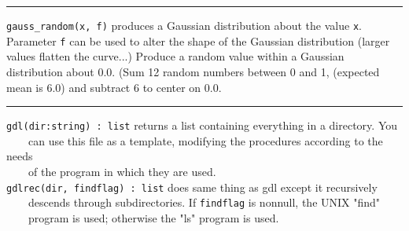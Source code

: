 
\vspace{0.25cm}\hrule{}

\texttt{gauss\_random(x, f)} produces a Gaussian distribution about the value \texttt{x}.
Parameter \texttt{f} can be used to alter the shape of the Gaussian
distribution (larger values flatten the curve...) Produce a random
value within a Gaussian distribution about 0.0. (Sum 12 random numbers
between 0 and 1, (expected mean is 6.0) and subtract 6 to center on 0.0.

\vspace{0.25cm}\hrule{}

\texttt{gdl(dir:string) : list} returns a list containing everything in
a directory. You\\
 \ \ \ \ can use this file as a template, modifying the procedures
according to the needs\\
 \ \ \ \ of the program in which they are used.\\
\texttt{gdlrec(dir, findflag) : list} does same thing as gdl except it
recursively\\
 \ \ \ \ descends through subdirectories. If \texttt{findflag} is
nonnull, the UNIX "find"\\
 \ \ \ \ program is used; otherwise the "ls" program
is used.

